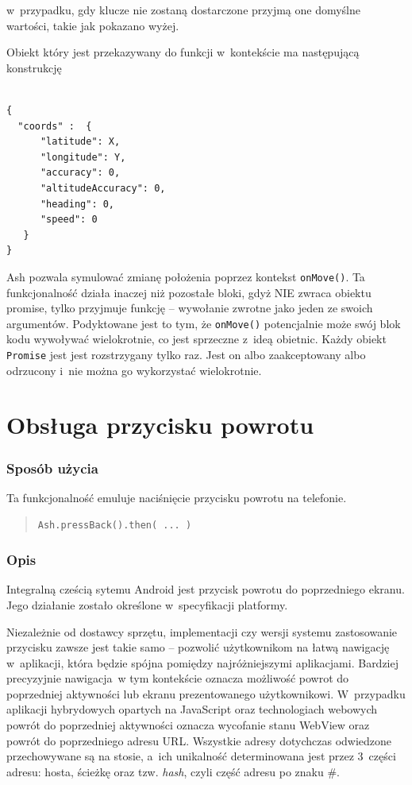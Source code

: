 \documentclass[brudnopis]{xmgr}
\begin{document}
w~przypadku, gdy klucze nie zostaną dostarczone przyjmą one domyślne wartości, takie jak pokazano wyżej. 

Obiekt który jest przekazywany do funkcji w~kontekście ma następującą konstrukcję 

\begin{lstlisting}

{
  "coords" :  {
      "latitude": X, 
      "longitude": Y,
      "accuracy": 0, 
      "altitudeAccuracy": 0, 
      "heading": 0, 
      "speed": 0
   }
}

\end{lstlisting}
Ash pozwala symulować zmianę położenia poprzez kontekst \texttt{onMove()}. Ta funkcjonalność działa inaczej niż pozostałe bloki, gdyż NIE zwraca obiektu promise, tylko przyjmuje funkcję -- wywołanie zwrotne jako jeden ze swoich argumentów. Podyktowane jest to tym, że \texttt{onMove()} potencjalnie może swój blok kodu wywoływać wielokrotnie, co jest sprzeczne z~ideą obietnic. Każdy obiekt \texttt{Promise} jest jest rozstrzygany tylko raz. Jest on albo zaakceptowany albo odrzucony i~nie można go wykorzystać wielokrotnie. 

\section{Obsługa przycisku powrotu}

\subsubsection{Sposób użycia}
Ta funkcjonalność emuluje naciśnięcie przycisku powrotu na telefonie. 

\begin{quote}
  \texttt{Ash.pressBack().then( ... )} 
\end{quote}

\subsubsection{Opis}

Integralną cześcią sytemu Android jest przycisk powrotu do poprzedniego ekranu. Jego działanie zostało określone w~specyfikacji platformy.

Niezależnie od dostawcy sprzętu, implementacji czy wersji systemu zastosowanie przycisku zawsze jest takie samo -- pozwolić użytkownikom na łatwą nawigację w~aplikacji, która będzie spójna pomiędzy najróżniejszymi aplikacjami. Bardziej precyzyjnie nawigacja~w tym kontekście  oznacza możliwość powrot do poprzedniej aktywności lub ekranu prezentowanego użytkownikowi. W~przypadku aplikacji hybrydowych opartych na JavaScript oraz technologiach webowych powrót do poprzedniej aktywności oznacza wycofanie stanu WebView oraz powrót do poprzedniego adresu URL. Wszystkie adresy dotychczas odwiedzone przechowywane są na stosie, a~ich unikalność determinowana jest przez 3~części adresu: hosta, ścieżkę oraz tzw. \textit{hash}, czyli część adresu po znaku \#. 
\end{document}
